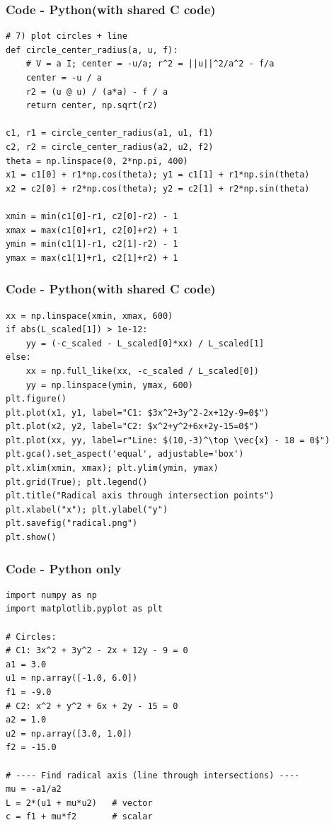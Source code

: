 \documentclass{beamer}
\theoremstyle{remark}
\let\vec\mathbf
\numberwithin{equation}{section}
\begin{document}
\begin{frame}[fragile]
\frametitle{Code - Python(with shared C code)}
\begin{lstlisting}
# 7) plot circles + line
def circle_center_radius(a, u, f):
    # V = a I; center = -u/a; r^2 = ||u||^2/a^2 - f/a
    center = -u / a
    r2 = (u @ u) / (a*a) - f / a
    return center, np.sqrt(r2)

c1, r1 = circle_center_radius(a1, u1, f1)
c2, r2 = circle_center_radius(a2, u2, f2)
theta = np.linspace(0, 2*np.pi, 400)
x1 = c1[0] + r1*np.cos(theta); y1 = c1[1] + r1*np.sin(theta)
x2 = c2[0] + r2*np.cos(theta); y2 = c2[1] + r2*np.sin(theta)

xmin = min(c1[0]-r1, c2[0]-r2) - 1
xmax = max(c1[0]+r1, c2[0]+r2) + 1
ymin = min(c1[1]-r1, c2[1]-r2) - 1
ymax = max(c1[1]+r1, c2[1]+r2) + 1

\end{lstlisting}
\end{frame}

\begin{frame}[fragile]
\frametitle{Code - Python(with shared C code)}
\begin{lstlisting}
xx = np.linspace(xmin, xmax, 600)
if abs(L_scaled[1]) > 1e-12:
    yy = (-c_scaled - L_scaled[0]*xx) / L_scaled[1]
else:
    xx = np.full_like(xx, -c_scaled / L_scaled[0])
    yy = np.linspace(ymin, ymax, 600)
plt.figure()
plt.plot(x1, y1, label="C1: $3x^2+3y^2-2x+12y-9=0$")
plt.plot(x2, y2, label="C2: $x^2+y^2+6x+2y-15=0$")
plt.plot(xx, yy, label=r"Line: $(10,-3)^\top \vec{x} - 18 = 0$")
plt.gca().set_aspect('equal', adjustable='box')
plt.xlim(xmin, xmax); plt.ylim(ymin, ymax)
plt.grid(True); plt.legend()
plt.title("Radical axis through intersection points")
plt.xlabel("x"); plt.ylabel("y")
plt.savefig("radical.png")
plt.show()

\end{lstlisting}
\end{frame}



\begin{frame}[fragile]
\frametitle{Code - Python only}
\begin{lstlisting}
import numpy as np
import matplotlib.pyplot as plt

# Circles:
# C1: 3x^2 + 3y^2 - 2x + 12y - 9 = 0
a1 = 3.0
u1 = np.array([-1.0, 6.0])
f1 = -9.0
# C2: x^2 + y^2 + 6x + 2y - 15 = 0
a2 = 1.0
u2 = np.array([3.0, 1.0])
f2 = -15.0

# ---- Find radical axis (line through intersections) ----
mu = -a1/a2
L = 2*(u1 + mu*u2)   # vector
c = f1 + mu*f2       # scalar




\end{lstlisting}
\end{frame}
\end{document}
